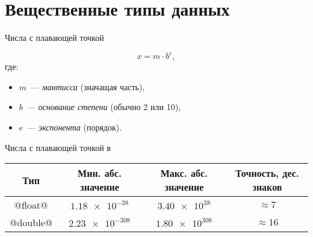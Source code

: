 \section{Вещественные типы данных}

\begin{frame}{Числа с плавающей точкой}


  {\Large \[ x = m \cdot b^e, \] }
  где:
  \begin{itemize}
    \item $m$~--- \emph{мантисса} (значащая часть),
    \item $b$~--- \emph{основание степени} (обычно 2 или 10),
    \item $e$~--- \emph{экспонента} (порядок).
  \end{itemize}

\end{frame}

\begin{frame}[fragile]{Числа с плавающей точкой в }

  \begin{table}
    \begin{tabular}{cccc}
      \hline
      Тип      & Мин. абс. значение & Макс. абс. значение & Точность, дес. знаков \\
      \hline
      @float@  & $\num{1.18e-38}$   & $\num{3.40e38}$     & $\approx 7$ \\
      @double@ & $\num{2.23e-308}$  & $\num{1.80e308}$    & $\approx 16$ \\
      \hline
    \end{tabular}
  \end{table}



\end{frame}

